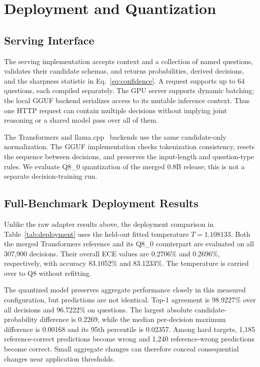 \section{Deployment and Quantization}
\label{sec:deployment}
\subsection{Serving Interface}
The serving implementation accepts context and a collection of named questions, validates their candidate schemas, and returns probabilities, derived decisions, and the sharpness statistic in Eq.~\eqref{eq:confidence}. A request supports up to 64 questions, each compiled separately. The GPU server supports dynamic batching; the local GGUF backend serializes access to its mutable inference context. Thus one HTTP request can contain multiple decisions without implying joint reasoning or a shared model pass over all of them.

The Transformers and llama.cpp~\citep{llamacpp} backends use the same candidate-only normalization. The GGUF implementation checks tokenization consistency, resets the sequence between decisions, and preserves the input-length and question-type rules. We evaluate Q8\_0 quantization of the merged 0.8B release; this is not a separate decision-training run.

\subsection{Full-Benchmark Deployment Results}

Unlike the raw adapter results above, the deployment comparison in Table~\ref{tab:deployment} uses the held-out fitted temperature $T=1.108133$. Both the merged Transformers reference and its Q8\_0 counterpart are evaluated on all 307,900 decisions. Their overall ECE values are 0.2706\% and 0.2696\%, respectively, with accuracy 83.1052\% and 83.1233\%. The temperature is carried over to Q8 without refitting.

The quantized model preserves aggregate performance closely in this measured configuration, but predictions are not identical. Top-1 agreement is 98.9227\% over all decisions and 96.7222\% on \score{} questions. The largest absolute candidate-probability difference is 0.2269, while the median per-decision maximum difference is 0.00168 and its 95th percentile is 0.02357. Among hard targets, 1,185 reference-correct predictions become wrong and 1,240 reference-wrong predictions become correct. Small aggregate changes can therefore conceal consequential changes near application thresholds.

